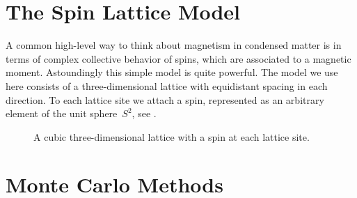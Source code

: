 \section{The Spin Lattice Model}\label{sec:model}
%
A common high-level way to think about magnetism in condensed matter is in terms
of complex collective behavior of spins, which are associated to a magnetic
moment. Astoundingly this simple model is quite powerful. The model we use here
consists of a three-dimensional lattice with equidistant spacing in each
direction. To each lattice site we attach a spin, represented as an arbitrary
element of the unit sphere~$S^2$, see .

\begin{figure}
\centering
{}%
\caption{A cubic three-dimensional lattice with a spin at each lattice site.}
\label{fig:lattice}
\end{figure}
%
\section{Monte Carlo Methods}\label{sec:mctheory}
%
\todo{}
